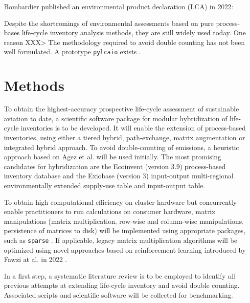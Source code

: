 \documentclass{article}
\begin{document}
    Bombardier published an environmental product declaration (LCA) in 2022: \cite{noauthor_challenger_2022}
    
    
        Despite the shortcomings of environmental assessments based on pure process-bases life-cycle inventory analysis methods, they are still widely used today. One reason XXX> The methodology required to avoid double counting has not been well formulated. A prototype \texttt{pylcaio}\cite{noauthor_pylcaio_2022} exists .
    
\section{Methods}

    To obtain the highest-accuracy prospective life-cycle assessment of sustainable aviation to date, a scientific software package for modular hybridization of life-cycle inventories is to be developed. It will enable the extension of process-based inventories, using either a tiered hybrid, path-exchange, matrix augmentation or integrated hybrid \cite{hauschild_life_2015}\cite{hauschild_life_2018}\cite{crawford_hybrid_2018} approach. To avoid double-counting of emissions, a heuristic approach based on Agez et al. \cite{agez_lifting_2019}\cite{agez_correcting_2022}\cite{agez_hybridization_2020} will be used initially. The most promising candidates for hybridization are the Ecoinvent (version 3.9) process-based inventory database and the Exiobase (version 3) input-output multi-regional environmentally extended supply-use  table and input-output table.
    
    To obtain high computational efficiency on cluster hardware but concurrently enable practitioners to run calculations on consumer hardware, matrix manipulations (matrix multiplication, row-wise and column-wise manipulations, persistence of matrices to disk) will be implemented using appropriate packages, such as \texttt{sparse} \cite{abbasi_sparse_2018}. If applicable, legacy matrix multiplication algorithms will be optimized using novel approaches based on reinforcement learning introduced by Fawzi at al. in 2022 \cite{fawzi_discovering_2022}.

    In a first step, a systematic literature review is to be employed to identify all previous attempts at extending life-cycle inventory and avoid double counting. Associated scripts and scientific software will be collected for benchmarking.
\end{document}
